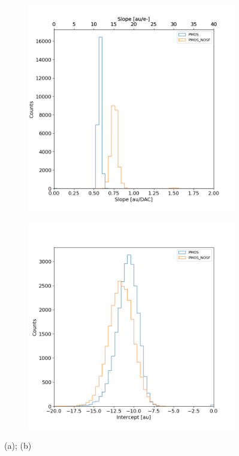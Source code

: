         \begin{figure}[h!]
            \begin{subfigure}{.5\textwidth}
            \centering
            \includegraphics[width=.98\linewidth]{figures/charaterization/slope_histogram.png}
            \end{subfigure}
            \begin{subfigure}{.5\textwidth}
            \centering
            \includegraphics[width=.98\linewidth]{figures/charaterization/intercept_histogram.png}
            \end{subfigure}
            \caption{(a); (b)}
            \label{fig:ToT_histograms_all_fl}
        \end{figure} 

